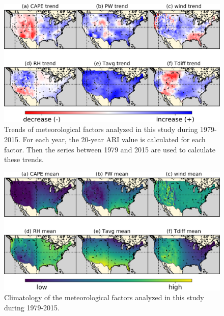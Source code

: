\begin{figure}[htbp]
	\includegraphics[width=\linewidth]{pics/ch4/figS2.png}
	\caption{Trends of meteorological factors analyzed in this study during 1979-2015. For each year, the 20-year ARI value is calculated for each factor. Then the series between 1979 and 2015 are used to calculate these trends.}
	\label{fig:4-S2}
\end{figure}

\begin{figure}[htbp]
	\includegraphics[width=\linewidth]{pics/ch4/figS3.png}
	\caption{Climatology of the meteorological factors analyzed in this study during 1979-2015.}
	\label{fig:4-S3}
\end{figure}

